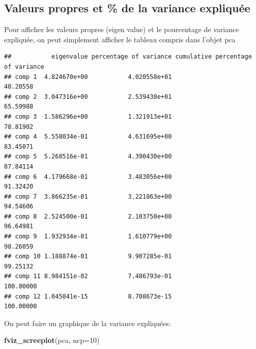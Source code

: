 \documentclass[
]{book}
\newenvironment{Shaded}{\begin{snugshade}}{\end{snugshade}}
\newcommand{\AttributeTok}[1]{\textcolor[rgb]{0.13,0.29,0.53}{#1}}
\newcommand{\DecValTok}[1]{\textcolor[rgb]{0.00,0.00,0.81}{#1}}
\newcommand{\FunctionTok}[1]{\textcolor[rgb]{0.13,0.29,0.53}{\textbf{#1}}}
\newcommand{\NormalTok}[1]{#1}
\newcommand{\SpecialCharTok}[1]{\textcolor[rgb]{0.81,0.36,0.00}{\textbf{#1}}}
\begin{document}
\hypertarget{valeurs-propres-et-de-la-variance-expliquuxe9e}{%
\subsection{Valeurs propres et \% de la variance expliquée}\label{valeurs-propres-et-de-la-variance-expliquuxe9e}}

Pour afficher les valeurs propres (eigen value) et le pourcentage de variance expliquée, on peut simplement afficher le tableau compris dans l'objet pca

\begin{Shaded}
\end{Shaded}

\begin{verbatim}
##           eigenvalue percentage of variance cumulative percentage of variance
## comp 1  4.824670e+00           4.020558e+01                          40.20558
## comp 2  3.047316e+00           2.539430e+01                          65.59988
## comp 3  1.586296e+00           1.321913e+01                          78.81902
## comp 4  5.558034e-01           4.631695e+00                          83.45071
## comp 5  5.268516e-01           4.390430e+00                          87.84114
## comp 6  4.179668e-01           3.483056e+00                          91.32420
## comp 7  3.866235e-01           3.221863e+00                          94.54606
## comp 8  2.524500e-01           2.103750e+00                          96.64981
## comp 9  1.932934e-01           1.610779e+00                          98.26059
## comp 10 1.188874e-01           9.907285e-01                          99.25132
## comp 11 8.984151e-02           7.486793e-01                         100.00000
## comp 12 1.045041e-15           8.708673e-15                         100.00000
\end{verbatim}

On peut faire un graphique de la variance expliquées:

\begin{Shaded}
\begin{Highlighting}[]
\FunctionTok{fviz\_screeplot}\NormalTok{(pca, }\AttributeTok{ncp=}\DecValTok{10}\NormalTok{)}
\end{Highlighting}
\end{Shaded}
\end{document}
